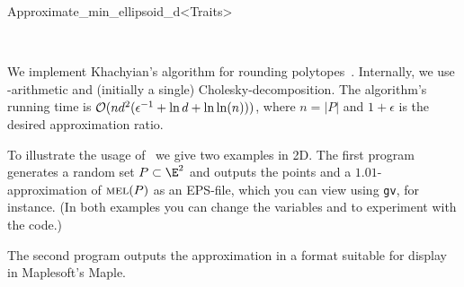 \begin{ccRefClass}{Approximate_min_ellipsoid_d<Traits>}
\begin{ccIndexMemberFunctions}
\def\ccTagRmConstRefPair{\ccFalse}


\def\ccTagRmConstRefPair{\ccTrue}

\end{ccIndexMemberFunctions}

\ccSeeAlso

\\[1ex]

\ccImplementation
\ccIndexImplementation

We implement Khachyian's algorithm for rounding
polytopes~\cite{cgal:k-rprnm-96}.  Internally, we use
-arithmetic and (initially a single)
Cholesky-decomposition.  The algorithm's running time is ${\cal
O}(nd^2(\epsilon^{-1}+\ln d + \ln\ln(n)))$, where $n=|P|$ and
$1+\epsilon$ is the desired approximation ratio.


\ccExample
{}

To illustrate the usage of \ccRefName\ we give two examples in 2D. The
first program generates a random set $P\subset\E^2$ and outputs the
points and a $1.01$-approximation of $\mathop{{\textsc{mel}}}\nolimits(P)$ as an EPS-file, which
you can view using {\tt gv}, for instance.  (In both examples you can
change the variables  and  to experiment with the code.)


The second program outputs the approximation in a format suitable
for display in Maplesoft's Maple.



\ccRestoreThreeColumns

\end{ccRefClass}


